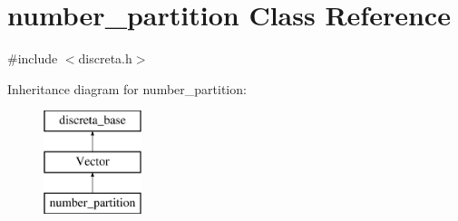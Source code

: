 \hypertarget{classnumber__partition}{}\section{number\+\_\+partition Class Reference}
\label{classnumber__partition}


{\ttfamily \#include $<$discreta.\+h$>$}

Inheritance diagram for number\+\_\+partition\+:\begin{figure}[H]
\begin{center}
\leavevmode
\includegraphics[height=3.000000cm]{classnumber__partition}
\end{center}
\end{figure}
